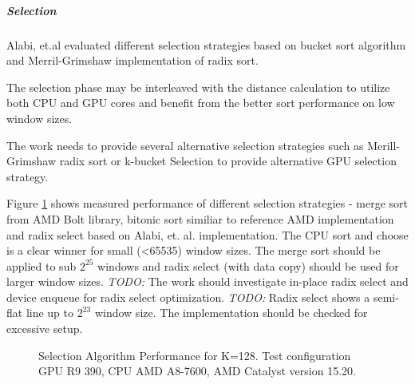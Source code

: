 \subparagraph*{Selection}

Alabi, et.al evaluated different selection strategies based on bucket sort algorithm and Merril-Grimshaw implementation of radix sort\cite{Alabi2012}.  

The selection phase may be interleaved with the distance calculation to utilize
both CPU and GPU cores and benefit from the better sort performance on low
window sizes\cite{IntelSortTechRep}.

The work needs to provide several alternative selection
strategies such as Merill-Grimshaw radix sort\cite{journals/ppl/MerrillG11} or
k-bucket Selection\cite{Alabi2012} to provide alternative GPU selection strategy.

Figure \ref{SortSelectPerformance} shows measured performance of different
selection strategies - merge sort from AMD Bolt library\cite{Bolt}, bitonic sort
similiar to reference AMD implementation and radix select based on Alabi, et.
al. implementation\cite{Alabi2012}. 
The CPU sort and choose is a clear winner for small (<65535) window sizes. The
merge sort should be applied to sub $ 2^25 $ windows
 and radix select (with data copy) should be used for larger window sizes. 
\textit{TODO:} The work should investigate in-place radix select and device
enqueue for radix select optimization.
\textit{TODO:} Radix select shows a semi-flat line up to $ 2^23 $ window size. The implementation should be checked for excessive setup.

\begin{figure}[h]
 \centering
 \caption{\label{SortSelectPerformance} Selection Algorithm Performance for
 K=128. Test configuration GPU R9 390, CPU AMD A8-7600, AMD Catalyst version
 15.20.}
\end{figure}



